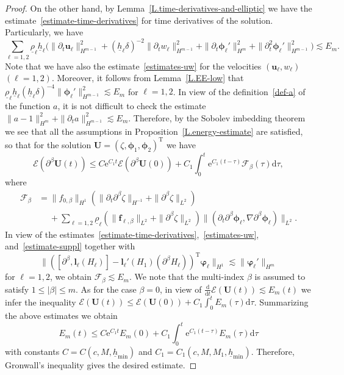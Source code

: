 \documentclass[11pt,leqno]{article}
\numberwithin{equation}{section}
\numberwithin{figure}{section}
\begin{document}
\begin{proof}
On the other hand, by Lemma~\ref{L.time-derivatives-and-elliptic} we have the estimate~\eqref{estimate-time-derivatives} 
for time derivatives of the solution. 
Particularly, we have 
%
\begin{equation}\label{estimate-suppl}
\sum_{\ell=1,2}\underline{\rho}_\ell\underline{h}_\ell \bigl( 
 \|\partial_t\bm{u}_\ell\|_{H^{m-1}}^2 + (\underline{h}_\ell\delta)^{-2}\|\partial_t w_\ell\|_{H^{m-1}}^2
 + \|\partial_t\bm{\phi}_\ell'\|_{H^m}^2 + \|\partial_t^2\bm{\phi}_\ell'\|_{H^{m-1}}^2 \bigr) \lesssim E_m. 
\end{equation}
%
Note that we have also the estimate~\eqref{estimates-uw} for the velocities $(\bm{u}_\ell,w_\ell)$ $(\ell=1,2)$. 
Moreover, it follows from Lemma~\ref{L.EE-low} that 
$\underline{\rho}_\ell\underline{h}_\ell (\underline{h}_\ell\delta)^{-4}\|\bm{\phi}_\ell'\|_{H^{m-1}}^2 \lesssim E_m$ 
for $\ell=1,2$. 
In view of the definition~\eqref{def-a} of the function $a$, it is not difficult to check the estimate 
$\|a-1\|_{H^m}^2 + \|\partial_t a\|_{H^{m-1}}^2 \lesssim E_m$. 
Therefore, by the Sobolev imbedding theorem we see that all the assumptions in Proposition~\ref{L.energy-estimate} are satisfied, 
so that for the solution $\bm{U}=(\zeta,\bm{\phi}_1,\bm{\phi}_2)^\mathrm{T}$ we have 
%
\[
\mathscr{E}(\partial^\beta{\bm{U}}(t)) \leq C\mathrm{e}^{C_1t}\mathscr{E}(\partial^\beta{\bm{U}}(0))
 + C_1\int_0^t\mathrm{e}^{C_1(t-\tau)}\mathscr{F}_\beta(\tau) \mathrm{d}\tau,
\]
%
where 
%
\begin{align*}
\mathscr{F}_\beta
&=  \|f_{0,\beta}\|_{H^1}( \|\partial_t\partial^\beta \zeta\|_{H^{-1}} + \|\partial^\beta \zeta\|_{L^2} ) \\
&\quad\;
 + \sum_{\ell=1,2}\underline{\rho}_\ell( \|\bm{f}_{\ell,\beta}\|_{L^2} + \|\partial^\beta \zeta\|_{L^2})
  \|(\partial_t\partial^\beta \bm{\phi}_\ell,\nabla\partial^\beta \bm{\phi}_\ell)\|_{L^2}.
\end{align*}
%
In view of the estimates~\eqref{estimate-time-derivatives},~\eqref{estimates-uw}, and~\eqref{estimate-suppl} 
together with 
%
\[
\| ([\partial^\beta,\bm{l}_\ell(H_\ell)]-\bm{l}_\ell'(H_1)(\partial^\beta H_\ell) )^\mathrm{T}
  \bm{ \varphi}_\ell\|_{H^1} \lesssim \|\bm{\varphi}_\ell'\|_{H^m}
\]
%
for $\ell=1,2$, we obtain $\mathscr{F}_\beta \lesssim E_m$. 
We note that the multi-index $\beta$ is assumed to satisfy ${1\leq |\beta|\leq m}$. 
As for the case $\beta=0$, in view of $\frac{\mathrm{d}}{\mathrm{d}t}\mathscr{E}(\bm{U}(t)) \lesssim E_m(t)$ 
we infer the inequality $\mathscr{E}({\bm{U}}(t)) \leq \mathscr{E}({\bm{U}}(0)) + C_1\int_0^t E_m(\tau) \mathrm{d}\tau$. 
Summarizing the above estimates we obtain 
%
\[
E_m(t) \leq C\mathrm{e}^{C_1t}E_m(0)
 + C_1\int_0^t\mathrm{e}^{C_1(t-\tau)}E_m(\tau) \mathrm{d}\tau
\]
%
with constants $C=C(c,M,\underline{h}_\mathrm{min})$ and $C_1=C_1(c,M,M_1,\underline{h}_\mathrm{min})$. 
Therefore, Gronwall's inequality gives the desired estimate. 
\end{proof}
\end{document}
